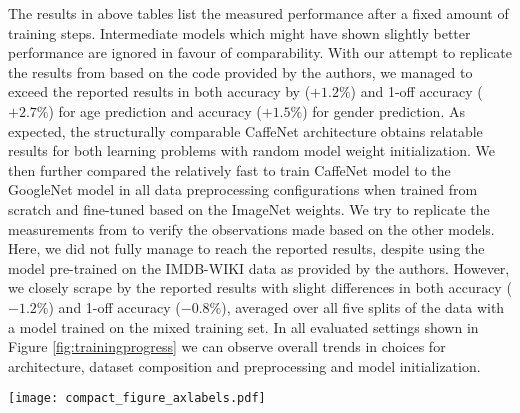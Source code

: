 \documentclass[10pt,twocolumn,letterpaper]{article}
\begin{document}
The results in above tables list the measured performance after a fixed amount of training steps. Intermediate models which might have shown slightly better performance are ignored in favour of comparability.
With our attempt to replicate the results from \cite{levi2015age} based on the code provided by the authors, we managed to exceed the reported results in both accuracy by ($+1.2\%$) and 1-off accuracy ($+2.7\%$) for age prediction and accuracy ($+1.5\%$) for gender prediction. As expected, the structurally comparable CaffeNet architecture obtains relatable results for both learning problems with random model weight initialization. We then further compared the relatively fast to train CaffeNet model to the GoogleNet model in all data  preprocessing configurations when trained from scratch and fine-tuned based on the ImageNet weights. We try to replicate the measurements from \cite{rothe2016deep} to verify the observations made based on the other models. Here, we did not fully manage to reach the reported results, despite using the model pre-trained on the IMDB-WIKI data as provided by the authors. However, we closely scrape by the reported results with slight differences in both accuracy ($-1.2\%$) and 1-off accuracy ($-0.8\%$), averaged over all five splits of the data with a model trained on the mixed training set.
In all evaluated settings shown in Figure \ref{fig:trainingprogress} we can observe overall trends in choices for architecture, dataset composition and preprocessing and model initialization. 

\begin{figure*}
\begin{center}
\texttt{[image: compact\_figure\_axlabels.pdf]}
\end{center}
	\caption{The plots are ordered column-wise over model architectures and row-wise according to prediction problem, showing model performance over training time given different initializations and data preprocessing settings.
	The top and bottom dashed lines in each plot show worst and best reference accuracy results from \cite{levi2015age,rothe2016deep} and \cite{dehghan2017dager}, with the horizontal axis increasing with training iterations.
	Thick lines show results taken by us. Color coding corresponds to data preprocessing and shading to model initialization: Blue color stands for affine $[$i$]$n-plane alignment. Violet lines correspond to $[$r$]$otation alignment. Orange lines show the model performances for training on the $[$m$]$ixed training set. Translucent line color stands for training with random model initialization, fully opaque and solid lines show performance for finetuning on ImageNet weights and dashed lines correspond to model initialization using IMDB-WIKI weights, only applied to the VGG-16 model.
	All results are averaged over the five splits of the Adience data set.} 
	\label{fig:trainingprogress}
\end{figure*}
\end{document}
